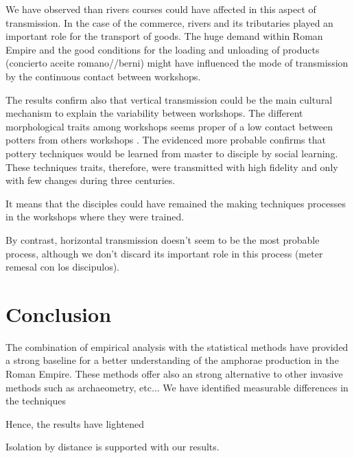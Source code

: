 \documentclass[review]{elsarticle}
\begin{document}

We have observed than rivers courses could have affected in this aspect of transmission. In the case of the commerce, rivers and its tributaries played an important role for the transport of goods. The huge demand within Roman Empire and the good conditions for the loading and unloading of products (concierto aceite romano//berni) might have influenced the mode of transmission by the continuous contact between workshops. 


 



 The results confirm also that vertical transmission could be the main cultural mechanism to explain the variability between workshops. The different morphological traits among workshops seems proper of a low contact between potters from others workshops . The evidenced more probable confirms that pottery techniques would be learned from master to disciple by social learning. These techniques traits, therefore, were transmitted with high fidelity and only with few changes during three centuries. 
 
 
 
 It means that the disciples could have remained the making techniques processes in the workshops where they were trained.  

 



By contrast, horizontal transmission doesn't seem to be the most probable process, although we don't discard its important role in this process (meter remesal con los discipulos). 


\section{Conclusion}
The combination of empirical analysis with the statistical methods have provided a strong baseline for a better understanding of the amphorae production in the Roman Empire. These methods offer also an strong alternative to other invasive methods  such as archaeometry, etc... We have identified measurable differences in the techniques 

Hence, the results have lightened 



Isolation by distance is supported with our results. 
\end{document}
